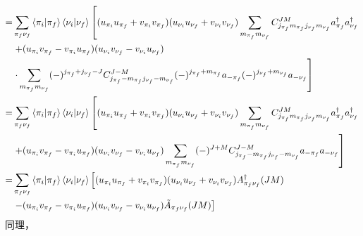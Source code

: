 \documentclass[master]{shnuthesis}
\begin{document}
\begin{align}
    = & \sum_{\pi_f \nu_f} \left\langle \pi_i|\pi_f \right\rangle \left\langle \nu_i|\nu_f \right\rangle \left[(u_{\pi_i}u_{\pi_f}+v_{\pi_i}v_{\pi_f})(u_{\nu_i}u_{\nu_f}+v_{\nu_i}v_{\nu_f})\sum_{m_{\pi_f}m_{\nu_f}} C_{j_{\pi_f} m_{\pi_f} j_{\nu_f} m_{\nu_f}}^{JM} a_{\pi_f}^\dagger a_{\nu_f}^\dagger \right.\notag\\
    & \left.+ (u_{\pi_i}v_{\pi_f}-v_{\pi_i}u_{\pi_f})(u_{\nu_i}v_{\nu_f}-v_{\nu_i}u_{\nu_f})\right. \notag\\
    & \left.\cdot \sum_{m_{\pi_f}m_{\nu_f}} (-)^{j_{\pi_f}+j_{\nu_f}-J}C_{j_{\pi_f} -m_{\pi_f} j_{\nu_f} -m_{\nu_f}}^{J-M} (-)^{j_{\pi_f}+m_{\pi_f}}a_{-\pi_f}(-)^{j_{\nu_f}+m_{\nu_f}}a_{-\nu_f}\right] \notag\\
    = & \sum_{\pi_f \nu_f} \left\langle \pi_i|\pi_f \right\rangle \left\langle \nu_i|\nu_f \right\rangle \left[(u_{\pi_i}u_{\pi_f}+v_{\pi_i}v_{\pi_f})(u_{\nu_i}u_{\nu_f}+v_{\nu_i}v_{\nu_f})\sum_{m_{\pi_f}m_{\nu_f}} C_{j_{\pi_f} m_{\pi_f} j_{\nu_f} m_{\nu_f}}^{JM} a_{\pi_f}^\dagger a_{\nu_f}^\dagger \right.\notag\\
    & \left.+ (u_{\pi_i}v_{\pi_f}-v_{\pi_i}u_{\pi_f})(u_{\nu_i}v_{\nu_f}-v_{\nu_i}u_{\nu_f}) \sum_{m_{\pi_f}m_{\nu_f}} (-)^{J+M}C_{j_{\pi_f} -m_{\pi_f} j_{\nu_f} -m_{\nu_f}}^{J-M} a_{-\pi_f}a_{-\nu_f}\right] \notag\\
    = & \sum_{\pi_f \nu_f} \left\langle \pi_i|\pi_f \right\rangle \left\langle \nu_i|\nu_f \right\rangle \left[(u_{\pi_i}u_{\pi_f}+v_{\pi_i}v_{\pi_f})(u_{\nu_i}u_{\nu_f}+v_{\nu_i}v_{\nu_f})A_{\pi_f \nu_f}^\dagger(JM) \right.\notag\\
    & \left.- (u_{\pi_i}v_{\pi_f}-v_{\pi_i}u_{\pi_f})(u_{\nu_i}v_{\nu_f}-v_{\nu_i}u_{\nu_f}) \tilde{A}_{\pi_f \nu_f}(JM) \right] \label{QiJM1}
\end{align}
同理，
\end{document}
